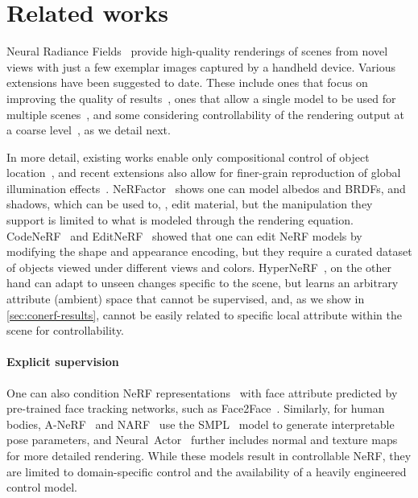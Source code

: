 \section{Related works}
  \label{sec:conerf-related}
  Neural Radiance Fields~\cite{mildenhall2020nerf} provide high-quality
  renderings of scenes from novel views with just a few exemplar images
  captured by a handheld device.
  Various extensions have been suggested to date.
  These include ones that focus on improving the quality of
  results~\cite{martin2021nerfw, park2020deformable, park2021hypernerf,
  zhang2020nerf++}, ones that allow a single model to be used for multiple
  scenes~\cite{schwarz2020graf, trevithick2020grf}, and some considering
  controllability of the rendering output at a coarse
  level~\cite{guo2020object, yu2021unsupervised, liu2021editing,
  yang2021learning, xie2021fig, zhang2021nerfactor}, as we detail next.

  In more detail, existing works enable only compositional control of object
  location~\cite{yang2021learning,yu2021unsupervised}, and recent extensions
  also allow for finer-grain reproduction of global illumination
  effects~\cite{guo2020object}.
  NeRFactor~\cite{zhang2021nerfactor} shows one can model albedos and BRDFs,
  and shadows, which can be used to, \eg, edit material, but the manipulation
  they support is limited to what is modeled through the rendering equation.
  CodeNeRF~\cite{jang2021codenerf} and EditNeRF~\cite{liu2021editing} showed
  that one can edit NeRF models by modifying the shape and appearance
  encoding, but they require a curated dataset of objects viewed under
  different views and colors.
  HyperNeRF~\cite{park2021hypernerf}, on the other hand can adapt to unseen
  changes specific to the scene, but learns an arbitrary attribute (ambient)
  space that cannot be supervised, and, as we show in
  \cref{sec:conerf-results}, cannot be easily related to specific local
  attribute within the scene for controllability.

  \paragraph{Explicit supervision}
    One can also condition NeRF representations~\cite{gafni2021dynamic} with
    face attribute predicted by pre-trained face tracking networks, such as
    Face2Face~\cite{thies2016face2face}.
    Similarly, for human bodies, A-NeRF~\cite{su2021anerf} and
    NARF~\cite{noguchi2021neural} use the SMPL~\cite{loper2015smpl} model to
    generate interpretable pose parameters, and
    Neural~Actor~\cite{liu2021neural} further includes normal and texture maps
    for more detailed rendering.
    While these models result in controllable NeRF, they are limited to
    domain-specific control and the availability of a heavily engineered
    control model.

